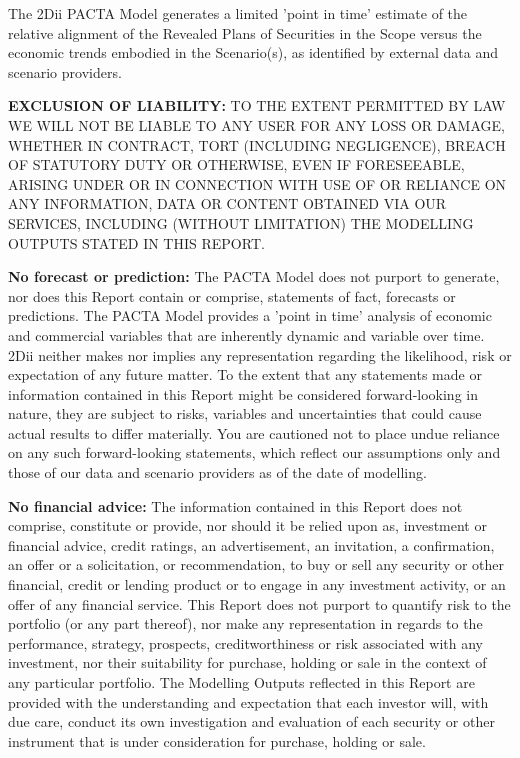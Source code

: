 \documentclass[10pt,table,a4]{article}\usepackage[]{graphicx}\usepackage[]{color}
\begin{document}
	
	The 2Dii PACTA Model generates a limited 'point in time' estimate of the relative alignment of the Revealed Plans of Securities in the Scope versus the economic trends embodied in the Scenario(s), as identified by external data and scenario providers. 
	
	\textbf{EXCLUSION OF LIABILITY: }TO THE EXTENT PERMITTED BY LAW WE WILL NOT BE LIABLE TO ANY USER FOR ANY LOSS OR DAMAGE, WHETHER IN CONTRACT, TORT (INCLUDING NEGLIGENCE), BREACH OF STATUTORY DUTY OR OTHERWISE, EVEN IF FORESEEABLE, ARISING UNDER OR IN CONNECTION WITH USE OF OR RELIANCE ON ANY INFORMATION, DATA OR CONTENT OBTAINED VIA OUR SERVICES, INCLUDING (WITHOUT LIMITATION) THE MODELLING OUTPUTS STATED IN THIS REPORT.
	
	\textbf{No forecast or prediction: }The PACTA Model does not purport to generate, nor does this Report contain or comprise, statements of fact, forecasts or predictions. The PACTA Model provides a 'point in time' analysis of economic and commercial variables that are inherently dynamic and variable over time. 2Dii neither makes nor implies any representation regarding the likelihood, risk or expectation of any future matter. To the extent that any statements made or information contained in this Report might be considered forward-looking in nature, they are subject to risks, variables and uncertainties that could cause actual results to differ materially. You are cautioned not to place undue reliance on any such forward-looking statements, which reflect our assumptions only and those of our data and scenario providers as of the date of modelling.
	
	\textbf{No financial advice: }The information contained in this Report does not comprise, constitute or provide, nor should it be relied upon as, investment or financial advice, credit ratings, an advertisement, an invitation, a confirmation, an offer or a solicitation, or recommendation, to buy or sell any security or other financial, credit or lending product or to engage in any investment activity, or an offer of any financial service. This Report does not purport to quantify risk to the portfolio (or any part thereof), nor make any representation in regards to the performance, strategy, prospects, creditworthiness or risk associated with any investment, nor their suitability for purchase, holding or sale in the context of any particular portfolio. The Modelling Outputs reflected in this Report are provided with the understanding and expectation that each investor will, with due care, conduct its own investigation and evaluation of each security or other instrument that is under consideration for purchase, holding or sale. 
	
\end{document}
